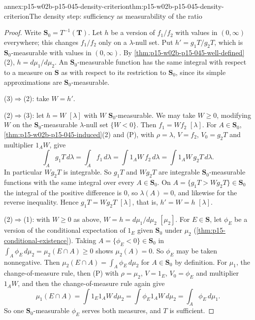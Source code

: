 \begin{annexitem}{annex:p15-w02b-p15-045-density-criterion}{thm:p15-w02b-p15-045-density-criterion}{The density step: sufficiency as measurability of the ratio}
\begin{proof}
Write \(\mathbf S_0=T^{-1}(\mathbf T)\). Let \(h\) be a version of
\(f_1/f_2\) with values in \((0,\infty)\) everywhere; this changes
\(f_1/f_2\) only on a \(\lambda\)-null set. Put \(h'=g_1T/g_2T\), which is
\(\mathbf S_0\)-measurable with values in \((0,\infty)\). By
\cref{thm:p15-w02b-p15-045-well-defined}(2), \(h=d\mu_1/d\mu_2\). An
\(\mathbf S_0\)-measurable function has the same integral with respect to
a measure on \(\mathbf S\) as with respect to its restriction to
\(\mathbf S_0\), since its simple approximations are
\(\mathbf S_0\)-measurable.

(3)\(\Rightarrow\)(2): take \(W=h'\).

(2)\(\Rightarrow\)(3): let \(h=W\) \([\lambda]\) with \(W\)
\(\mathbf S_0\)-measurable. We may take \(W\geq0\), modifying \(W\) on the
\(\mathbf S_0\)-measurable \(\lambda\)-null set \(\{W<0\}\). Then
\(f_1=Wf_2\) \([\lambda]\). For \(A\in\mathbf S_0\),
\cref{thm:p15-w02b-p15-045-induced}(2) and (P), with \(\rho=\lambda\),
\(V=f_2\), \(V_0=g_2T\) and multiplier \(1_AW\), give
\[
  \int_Ag_1T\,d\lambda=\int_Af_1\,d\lambda=\int1_AW\,f_2\,d\lambda
  =\int1_AW\,g_2T\,d\lambda .
\]
In particular \(Wg_2T\) is integrable. So \(g_1T\) and \(Wg_2T\) are
integrable \(\mathbf S_0\)-measurable functions with the same integral
over every \(A\in\mathbf S_0\). On \(A=\{g_1T>Wg_2T\}\in\mathbf S_0\) the
integral of the positive difference is \(0\), so \(\lambda(A)=0\), and
likewise for the reverse inequality. Hence \(g_1T=Wg_2T\) \([\lambda]\),
that is, \(h'=W=h\) \([\lambda]\).

(2)\(\Rightarrow\)(1): with \(W\geq0\) as above, \(W=h=d\mu_1/d\mu_2\)
\([\mu_2]\). For \(E\in\mathbf S\), let \(\phi_E\) be a version of the
conditional expectation of \(1_E\) given \(\mathbf S_0\) under \(\mu_2\)
(\cref{thm:p15-conditional-existence}). Taking
\(A=\{\phi_E<0\}\in\mathbf S_0\) in
\(\int_A\phi_E\,d\mu_2=\mu_2(E\cap A)\geq0\) shows \(\mu_2(A)=0\). So
\(\phi_E\) may be taken nonnegative. Then
\(\mu_2(E\cap A)=\int_A\phi_E\,d\mu_2\) for \(A\in\mathbf S_0\) by
definition. For \(\mu_1\), the change-of-measure rule, then (P) with
\(\rho=\mu_2\), \(V=1_E\), \(V_0=\phi_E\) and multiplier \(1_AW\), and
then the change-of-measure rule again give
\[
  \mu_1(E\cap A)=\int1_E1_AW\,d\mu_2=\int\phi_E1_AW\,d\mu_2=\int_A\phi_E\,d\mu_1 .
\]
So one \(\mathbf S_0\)-measurable \(\phi_E\) serves both measures, and
\(T\) is sufficient.


\end{proof}
\end{annexitem}
